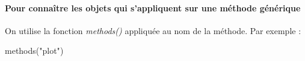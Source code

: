 \documentclass[
]{book}
\newenvironment{Shaded}{\begin{snugshade}}{\end{snugshade}}
\newcommand{\FunctionTok}[1]{\textcolor[rgb]{0.00,0.00,0.00}{#1}}
\newcommand{\NormalTok}[1]{#1}
\newcommand{\StringTok}[1]{\textcolor[rgb]{0.31,0.60,0.02}{#1}}
\theoremstyle{definition}
\theoremstyle{definition}
\theoremstyle{definition}
\theoremstyle{definition}
\theoremstyle{remark}
\begin{document}
\hypertarget{pour-connauxeetre-les-objets-qui-sappliquent-sur-une-muxe9thode-guxe9nuxe9rique}{%
\paragraph{Pour connaître les objets qui s'appliquent sur une méthode générique}\label{pour-connauxeetre-les-objets-qui-sappliquent-sur-une-muxe9thode-guxe9nuxe9rique}}

On utilise la fonction \emph{methods()} appliquée au nom de la méthode. Par exemple :

\begin{Shaded}
\begin{Highlighting}[]
\FunctionTok{methods}\NormalTok{(}\StringTok{"plot"}\NormalTok{)}
\end{Highlighting}
\end{Shaded}
\end{document}
